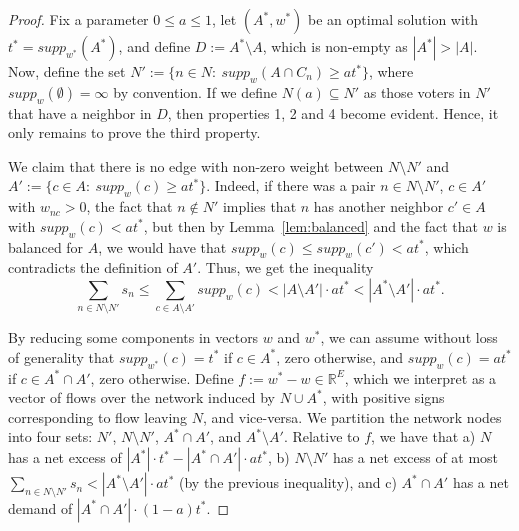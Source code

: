 \begin{proof}
Fix a parameter $0\leq a\leq 1$, let $(A^*, w^*)$ be an optimal solution with $t^*=supp_{w^*}(A^*)$, and define $D:=A^*\setminus A$, which is non-empty as $|A^*|>|A|$. Now, define the set $N':=\{n\in N: \ supp_w(A\cap C_n)\geq at^*\}$, where $supp_w(\emptyset)=\infty$ by convention. If we define $N(a)\subseteq N'$ as those voters in $N'$ that have a neighbor in $D$, then properties 1, 2 and 4 become evident. Hence, it only remains to prove the third property.

We claim that there is no edge with non-zero weight between $N\setminus N'$ and $A':=\{c\in A: \ supp_w(c)\geq at^*\}$. 
Indeed, if there was a pair $n\in N\setminus N'$, $c\in A'$ with $w_{nc}>0$, the fact that $n\notin N'$ implies that $n$ has another neighbor $c'\in A$ with $supp_w(c)<at^*$, but then by Lemma~\ref{lem:balanced} and the fact that $w$ is balanced for $A$, we would have that $supp_w(c)\leq supp_w(c')<at^*$, which contradicts the definition of $A'$. Thus, we get the inequality
$$\sum_{n\in N\setminus N'} s_n \leq \sum_{c\in A\setminus A'} supp_w(c) < |A\setminus A'|\cdot at^*< |A^*\setminus A'|\cdot at^*.$$

By reducing some components in vectors $w$ and $w^*$, we can assume without loss of generality that $supp_{w^*}(c)=t^*$ if $c\in A^*$, zero otherwise, and $supp_{w}(c)=a t^*$ if $c\in A^*\cap A'$, zero otherwise. Define $f:=w^* - w\in\mathbb{R}^E$, which we interpret as a vector of flows over the network induced by $N\cup A^*$, with positive signs corresponding to flow leaving $N$, and vice-versa. We partition the network nodes into four sets: $N'$, $N\setminus N'$, $A^*\cap A'$, and $A^*\setminus A'$. Relative to $f$, we have that a) $N$ has a net excess of $|A^*|\cdot t^* - |A^*\cap A'|\cdot a t^*$, b) $N\setminus N'$ has a net excess of at most $\sum_{n\in N\setminus N'} s_n < |A^*\setminus A'|\cdot at^*$ (by the previous inequality), and c) $A^*\cap A'$ has a net demand of $|A^*\cap A'|\cdot (1-a) t^*$. 


\end{proof}
